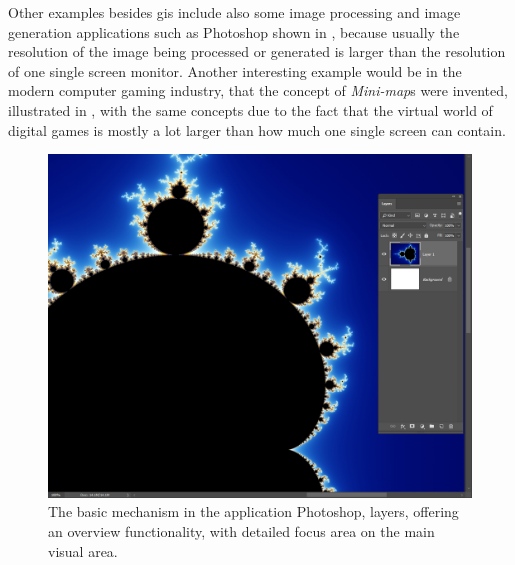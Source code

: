Other examples besides \gls{gis} include also some image processing and image generation applications such as Photoshop shown in , because usually the resolution of the image being processed or generated is larger than the resolution of one single screen monitor. Another interesting example would be in the modern computer gaming industry, that the concept of \emph{Mini-map}s were invented, illustrated in , with the same concepts due to the fact that the virtual world of digital games is mostly a lot larger than how much one single screen can contain.

\begin{figure}[th]
\centering
\includegraphics[width=\textwidth,keepaspectratio]{Figures/Chapter1/ps.png}
\decoRule
\caption[Overview Plus Detail in Photoshop]{The basic mechanism in the application Photoshop, layers, offering an overview functionality, with detailed focus area on the main visual area.}
\label{fig:ps}
\end{figure}

